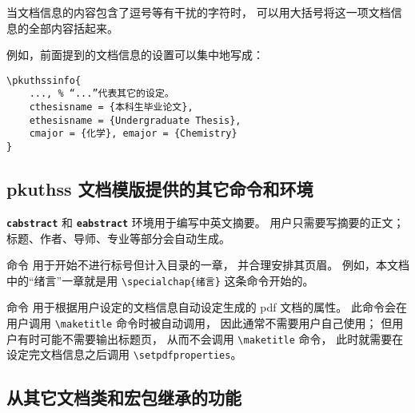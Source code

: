 		当文档信息的内容包含了逗号等有干扰的字符时，
		可以用大括号将这一项文档信息的全部内容括起来。%

		例如，前面提到的文档信息的设置可以集中地写成：
\begin{Verbatim}[frame = single, tabsize = 4]
\pkuthssinfo{
	..., % “...”代表其它的设定。
	cthesisname = {本科生毕业论文},
	ethesisname = {Undergraduate Thesis},
	cmajor = {化学}, emajor = {Chemistry}
}
\end{Verbatim}

		\subsection{pkuthss 文档模版提供的其它命令和环境}\label{ssec:misc}

		\texttt{\bfseries cabstract} 和 \texttt{\bfseries eabstract} %
		环境用于编写中英文摘要。
		用户只需要写摘要的正文；标题、作者、导师、专业等部分会自动生成。

		\texttt{\bfseries\string\specialchap} 命令%
		用于开始不进行标号但计入目录的一章，
		并合理安排其页眉。%
		例如，本文档中的“绪言”一章就是用 \verb|\specialchap{绪言}| %
		这条命令开始的。%

		\texttt{\bfseries\string\setpdfproperties} 命令%
		用于根据用户设定的文档信息自动设定生成的 pdf 文档的属性。
		此命令会在用户调用 \verb|\maketitle| 命令时被自动调用，
		因此通常不需要用户自己使用；
		但用户有时可能不需要输出标题页，
		从而不会调用 \verb|\maketitle| 命令，
		此时就需要在设定完文档信息之后调用 \verb|\setpdfproperties|。

		\subsection{从其它文档类和宏包继承的功能}\label{ssec:thirdparty}

